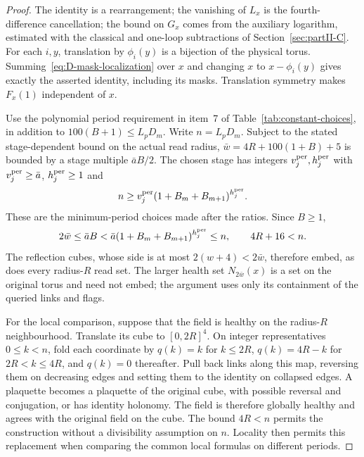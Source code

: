 \begin{proof}
The identity is a rearrangement; the vanishing of $L_x$ is the fourth-difference cancellation; the bound on $G_x$ comes from the auxiliary logarithm, estimated with the classical and one-loop subtractions of Section~\ref{sec:partII-C}. For each $i,y$, translation by $\phi_i(y)$ is a bijection of the physical torus. Summing~\eqref{eq:D-mask-localization} over $x$ and changing $x$ to $x-\phi_i(y)$ gives exactly the asserted identity, including its masks. Translation symmetry makes $F_x(1)$ independent of $x$.

Use the polynomial period requirement in item~7 of Table~\ref{tab:constant-choices}, in addition to $100(B+1)\le L_pD_m$. Write $n=L_pD_m$. Subject to the stated stage-dependent bound on the actual read radius, $\bar w=4R+100(1+B)+5$ is bounded by a stage multiple $\bar a B/2$. The chosen stage has integers $v_j^{\rm per},h_j^{\rm per}$ with $v_j^{\rm per}\ge\bar a$, $h_j^{\rm per}\ge1$ and
\begin{equation*}
n\ge v_j^{\rm per}(1+B_m+B_{m+1})^{h_j^{\rm per}}.
\end{equation*}
These are the minimum-period choices made after the ratios. Since $B\ge1$,
\begin{equation*}
2\bar w\le\bar aB<\bar a(1+B_m+B_{m+1})^{h_j^{\rm per}}\le n,
\qquad 4R+16<n.
\end{equation*}
The reflection cubes, whose side is at most $2(w+4)<2\bar w$, therefore embed, as does every radius-$R$ read set. The larger health set $N_{2\bar w}(x)$ is a set on the original torus and need not embed; the argument uses only its containment of the queried links and flags.

For the local comparison, suppose that the field is healthy on the radius-$R$ neighbourhood. Translate its cube to $[0,2R]^4$. On integer representatives $0\le k<n$, fold each coordinate by $q(k)=k$ for $k\le2R$, $q(k)=4R-k$ for $2R<k\le4R$, and $q(k)=0$ thereafter. Pull back links along this map, reversing them on decreasing edges and setting them to the identity on collapsed edges. A plaquette becomes a plaquette of the original cube, with possible reversal and conjugation, or has identity holonomy. The field is therefore globally healthy and agrees with the original field on the cube. The bound $4R<n$ permits the construction without a divisibility assumption on $n$. Locality then permits this replacement when comparing the common local formulas on different periods.


\end{proof}
